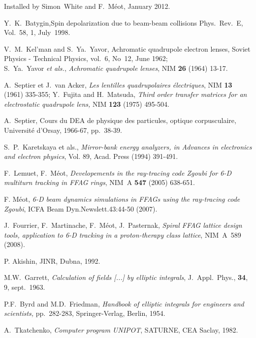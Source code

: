 \begin{thebibliography}{99}
 Installed by Simon~White and F.~M\'eot, January 2012. 

 Y.~K.~Batygin,Spin depolarization due to beam-beam collisions
Phys.~Rev.~E, Vol.~58,  1, July~1998. 

 V.~M.~Kel'man and S.~Ya.~Yavor, Achromatic
quadrupole electron lenses, Soviet Physics - Technical Physics, vol.~6, No~12, June 1962; \\
S.~Ya.~Yavor \textsl{et als.}, \textsl{Achromatic quadrupole lenses}, NIM \textbf{26} (1964) 13-17. 

 A.~Septier et J.~van Acker, \textsl{Les lentilles quadrupolaires 
\'electriques}, NIM \textbf{13} (1961) 335-355; Y.~Fujita and H.~Matsuda, 
\textsl{Third order transfer matrices for an electrostatic quadrupole lens,} 
NIM \textbf{123} (1975) 495-504. 

 A.~Septier, Cours du DEA de physique des
particules, optique corpusculaire, Universit\'e d'Orsay, 1966-67, pp.~38-39.  


\newpage

 S.~P.~Karetskaya et als., 
\textsl{Mirror-bank energy analyzers, in Advances in electronics and electron physics}, 
Vol. 89, Acad. Press (1994) 391-491. 

 F.~Lemuet, F.~M\'eot, \textsl{Developements in the ray-tracing code Zgoubi for 
6-D multiturn tracking in FFAG rings}, NIM~A \textbf{547} (2005) 638-651. 

 F. M\'eot,  
\textsl{6-D beam dynamics simulations in FFAGs using the ray-tracing code Zgoubi}, 
ICFA Beam Dyn.Newslett.43:44-50 (2007).

 J.~Fourrier, F.~Martinache, F.~M\'eot, J.~Pasternak, 
\textsl{Spiral FFAG lattice design tools,  application to 6-D tracking in a proton-therapy class lattice}, 
NIM~A~589 (2008). 

 P. Akishin, JINR, Dubna, 1992.

 M.W.~Garrett, \textsl{Calculation of
fields  [...] by elliptic integrals}, J.~Appl.~Phys., \textbf{34}, 9, sept.~1963.  

 P.F.~Byrd and M.D.~Friedman, \textsl{Handbook of elliptic integrals 
for engineers and scientists,} pp.~282-283, Springer-Verlag, Berlin, 1954.  

 A.~Tkatchenko, \textsl{Computer program UNIPOT}, SATURNE, CEA Saclay, 1982. 


\end{thebibliography}
